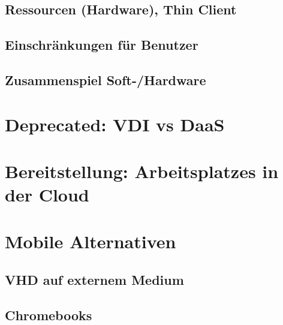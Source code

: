 \subsection{Ressourcen (Hardware), Thin Client}

\subsection{Einschränkungen für Benutzer}

\subsection{Zusammenspiel Soft-/Hardware}

\section{Deprecated: VDI vs DaaS}




\section{Bereitstellung: Arbeitsplatzes in der Cloud}



\section{Mobile Alternativen}

\subsection{VHD auf externem Medium}

\subsection{Chromebooks}
